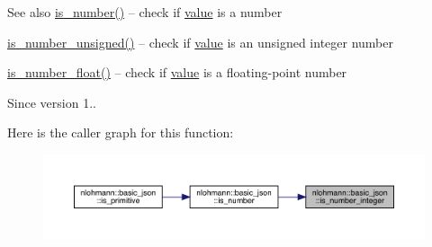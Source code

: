\begin{DoxySeeAlso}{See also}
\mbox{\hyperlink{classnlohmann_1_1basic__json_a2b9852390abb4b1ef5fac6984e2fc0f3}{is\+\_\+number()}} -- check if \mbox{\hyperlink{classnlohmann_1_1basic__json_af9c51328fbe1da75eca750be3009917a}{value}} is a number 

\mbox{\hyperlink{classnlohmann_1_1basic__json_abc7378cba0613a78b9aad1c8e7044bb0}{is\+\_\+number\+\_\+unsigned()}} -- check if \mbox{\hyperlink{classnlohmann_1_1basic__json_af9c51328fbe1da75eca750be3009917a}{value}} is an unsigned integer number 

\mbox{\hyperlink{classnlohmann_1_1basic__json_a33b4bf898b857c962e798fc7f6e86e70}{is\+\_\+number\+\_\+float()}} -- check if \mbox{\hyperlink{classnlohmann_1_1basic__json_af9c51328fbe1da75eca750be3009917a}{value}} is a floating-\/point number
\end{DoxySeeAlso}
\begin{DoxySince}{Since}
version 1.. 
\end{DoxySince}
Here is the caller graph for this function\+:\nopagebreak
\begin{figure}[H]
\begin{center}
\leavevmode
\includegraphics[width=350pt]{classnlohmann_1_1basic__json_abac8af76067f1e8fdca9052882c74428_icgraph}
\end{center}
\end{figure}
\mbox{\label{classnlohmann_1_1basic__json_abc7378cba0613a78b9aad1c8e7044bb0}} 

